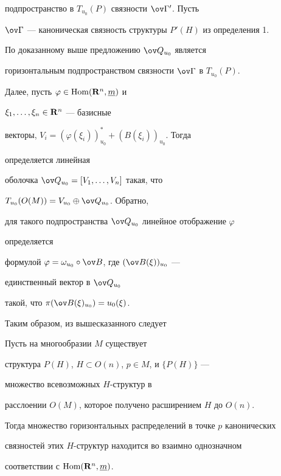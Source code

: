 подпространство в $T_{u_0}(P)$ связности $\ov\Gamma{}'$. Пусть


$\ov\Gamma$ --- каноническая связность структуры $P'(H)$ из определения 1. 


По доказанному выше предложению $\ov Q_{u_0}$ является


горизонтальным подпространством связности $\ov\Gamma$ в $T_{u_0}(P)$. 


 


Далее, пусть $\varphi\in\operatorname{Hom}(\bold R^n,\underline m)$ и 


$\xi_1,\dotsc,\xi_n\in\bold R^n$ --- базисные 


векторы, $V_i=(\varphi(\xi_i))^*_{u_0}+(B(\xi_i))_{u_0}$. Тогда 


определяется линейная 


оболочка $\ov Q_{u_0}=[V_1,\dotsc,V_n]$ такая, что 


$T_{u_0}(O(M))=V_{u_0}\oplus\ov Q_{u_0}$. Обратно, 


для такого подпространства $\ov Q_{u_0}$ линейное отображение $\varphi$ 


определяется 


формулой $\varphi=\omega_{u_0}\circ\ov B$, где $(\ov B(\xi))_{u_0}$ --- 


единственный вектор в $\ov Q_{u_0}$ 


такой, что $\pi(\ov B(\xi)_{u_0})=u_0(\xi)$. 


 


Таким образом, из вышесказанного следует 


 


\begin{thm} 


Пусть на многообразии $M$ существует 


структура $P(H)$, $H\subset O(n)$, $p\in M$, и $\{P(H)\}$ --- 


множество всевозможных $H$-структур в 


расслоении $O(M)$, которое получено расширением $H$ до $O(n)$. 


Тогда множество горизонтальных распределений в точке $p$ канонических 


связностей этих $H$-структур находится во взаимно однозначном 


соответствии с $\operatorname{Hom}(\bold R^n,\underline m)$. 


\end{thm} 


